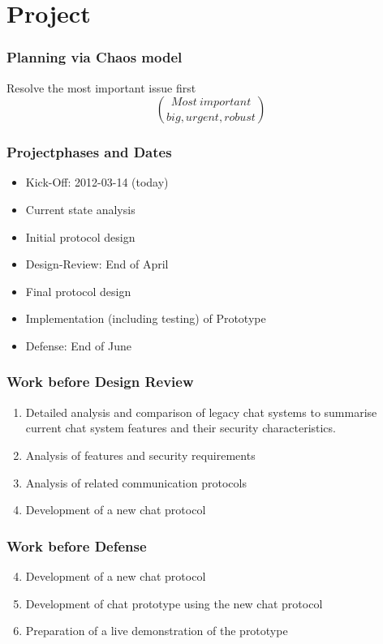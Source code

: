 \documentclass{beamer}
\begin{document}
\section{Project}
\frame
{
  \frametitle{Planning via Chaos model}
  \begin{center}
    Resolve the most important issue first
    $$Most\ important \choose{} big, urgent, robust$$
  \end{center}
}
\frame
{
  \frametitle{Projectphases and Dates}
  \begin{itemize}
     \item \alert{Kick-Off: 2012-03-14 (today)}
     \item Current state analysis
     \item Initial protocol design
     \item \alert{Design-Review: End of April}
     \item Final protocol design
     \item Implementation (including testing) of Prototype
     \item \alert{Defense: End of June}
  \end{itemize}
}
\frame
{
  \frametitle{Work before Design Review}
  \begin{enumerate}
     \item Detailed analysis and comparison of legacy chat systems
        to summarise current chat system features and their
        security characteristics.
    \item Analysis of features and security requirements
    \item Analysis of related communication protocols
    \item Development of a new chat protocol
  \end{enumerate}
}
\frame
{
  \frametitle{Work before Defense}
  \begin{enumerate}
    \setcounter{enumi}{3}
    \item Development of a new chat protocol
    \item Development of chat prototype using the new chat protocol
    \item Preparation of a live demonstration of the prototype
  \end{enumerate}
}
\end{document}
